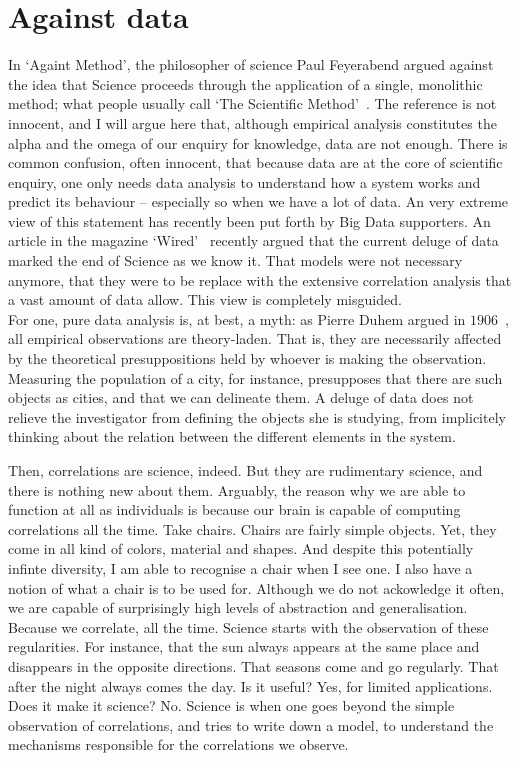 \section{Against data}
\label{sec:against_data}

In `Againt Method', the philosopher of science Paul Feyerabend argued against
the idea that Science proceeds through the application of a single, monolithic
method; what people usually call `The Scientific Method'~\cite{Feyerabend:1975}.
The reference is not innocent, and I will argue here that, although empirical
analysis constitutes the alpha and the omega of our enquiry for knowledge, data
are not enough.
There is common confusion, often innocent, that because data are at the core of
scientific enquiry, one only needs data analysis to understand how a system
works and predict its behaviour -- especially so when we have a lot of data. An
very extreme view of this statement has recently been put forth by Big Data
supporters. An article in the magazine `Wired'~\cite{Anderson:2008} recently
argued that the current deluge of data marked the end of Science as we know it.
That models were not necessary anymore, that they were to be replace with the
extensive correlation analysis that a vast amount of data allow. This view is
completely misguided.\\

For one, pure data analysis is, at best, a myth: as Pierre Duhem argued in
$1906$~\cite{Duhem:1997}, all empirical observations are theory-laden. That is,
they are necessarily affected by the theoretical presuppositions held by whoever
is making the observation. Measuring the population of a city, for instance,
presupposes that there are such objects as cities, and that we can delineate
them. A deluge of data does not relieve the investigator from defining the
objects she is studying, from implicitely thinking about the relation between
the different elements in the system.

Then, correlations are science, indeed. But they are rudimentary science, and
there is nothing new about them. Arguably, the reason why we are able to
function at all as individuals is because our brain is capable of computing
correlations all the time. Take chairs. Chairs are fairly simple objects. Yet,
they come in all kind of colors, material and shapes. And despite this
potentially infinte diversity, I am able to recognise a chair when I see one. I
also have a notion of what a chair is to be used for. Although we do not
ackowledge it often, we are capable of surprisingly high levels of abstraction
and generalisation. Because we correlate, all the time. Science starts with the
observation of these regularities. For instance, that the sun always appears at
the same place and disappears in the opposite directions. That seasons come and
go regularly. That after the night always comes the day. Is it useful? Yes, for
limited applications. Does it make it science? No. Science is when one goes
beyond the simple observation of correlations, and tries to write down a model,
to understand the mechanisms responsible for the correlations we observe.\\

